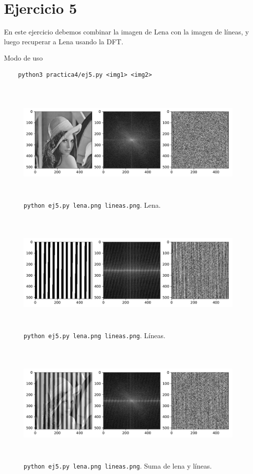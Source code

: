 \documentclass[11pt, spanish]{article}
\begin{document}
\newpage
\section{Ejercicio 5}

En este ejercicio debemos combinar la imagen de Lena con la imagen de líneas, y luego recuperar a Lena usando la DFT.

Modo de uso
\begin{verbatim}
    python3 practica4/ej5.py <img1> <img2>
\end{verbatim}


\begin{figure}[H]
\centering
  \includegraphics[height=6cm]{informe-imgs/ej5-lena.pdf}
  \caption{\texttt{python ej5.py lena.png lineas.png}. Lena.}
\end{figure}

\begin{figure}[H]
\centering
  \includegraphics[height=6cm]{informe-imgs/ej5-lineas.pdf}
  \caption{\texttt{python ej5.py lena.png lineas.png}. Líneas.}
\end{figure}

\begin{figure}[H]
\centering
  \includegraphics[height=6cm]{informe-imgs/ej5-suma.pdf}
  \caption{\texttt{python ej5.py lena.png lineas.png}. Suma de lena y líneas.}
\end{figure}
\end{document}
